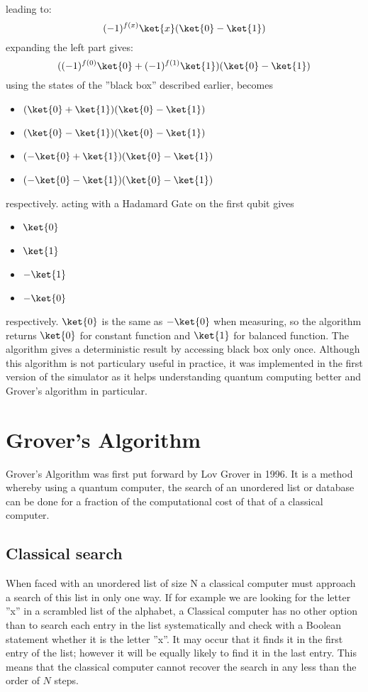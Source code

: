 \documentclass[12pt]{report}
\begin{document}
leading to:
\begin{equation}
(-1)^{f(x)}\ket{x}(\ket{0}-\ket{1})
\end{equation}
expanding the left part gives:
\begin{equation}
((-1)^{f(0)}\ket{0}+(-1)^{f(1)}\ket{1})(\ket{0}-\ket{1})
\end{equation}
using the states of the ''black box'' described earlier, becomes
\begin{itemize}
\item $(\ket{0}+\ket{1})(\ket{0}-\ket{1})$
\item $(\ket{0}-\ket{1})(\ket{0}-\ket{1})$
\item $(-\ket{0}+\ket{1})(\ket{0}-\ket{1})$
\item $(-\ket{0}-\ket{1})(\ket{0}-\ket{1})$
\end{itemize}
respectively. acting with a Hadamard Gate on the first qubit gives
\begin{itemize}
\item $\ket{0}$
\item $\ket{1}$
\item $-\ket{1}$
\item $-\ket{0}$
\end{itemize}
respectively. $\ket{0}$ is the same as $-\ket{0}$ when measuring, so the algorithm returns $\ket{0}$ for constant function and $\ket{1}$ for balanced function. The algorithm gives a deterministic result by accessing black box only once. Although this algorithm is not particulary useful in practice, it was implemented in the first version of the simulator as it helps understanding quantum computing better and Grover's algorithm in particular.
\section{Grover's Algorithm}
Grover's Algorithm was first put forward by Lov Grover \cite{10} in 1996. It is a method whereby using a quantum computer, the search of an unordered list or database can be done for a fraction of the computational cost of that of a classical computer.
\subsection{Classical search}
When faced with an unordered list of size N a classical computer must approach a search of this list in only one way. If for example we are looking for the letter ''x'' in a scrambled list of the alphabet, a Classical computer has no other option than to search each entry in the list systematically and check with a Boolean statement whether it is the letter ''x''. It may occur that it finds it in the first entry of the list; however it will be equally likely to find it in the last entry. This means that the classical computer cannot recover the search in any less than the order of $N$ steps\cite{11}.
\end{document}
